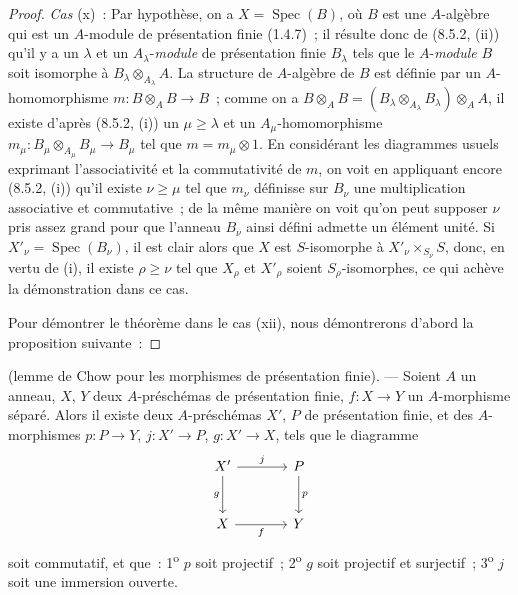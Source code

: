 \begin{proof}
\emph{Cas} (x)~: Par hypothèse, on a $X=\operatorname{Spec}(B)$, où $B$ est
une $A$-algèbre qui est un $A$-module de présentation finie (1.4.7)~; il
résulte donc de (8.5.2, (ii)) qu'il y a un $\lambda$ et un $A_\lambda$-\emph{module}
de présentation finie $B_\lambda$ tels que le $A$-\emph{module} $B$ soit isomorphe à
$B_\lambda\otimes_{A_\lambda}A$. La structure de $A$-algèbre de $B$ est
définie par un $A$-homomorphisme $m:B\otimes_AB\to B$~; comme on a
$B\otimes_AB=(B_\lambda\otimes_{A_\lambda}B_\lambda)\otimes_AA$, il existe
d'après (8.5.2, (i)) un $\mu\geq\lambda$ et un $A_\mu$-homomorphisme
$m_\mu:B_\mu\otimes_{A_\mu}B_\mu\to B_\mu$ tel que $m=m_\mu\otimes1$. En
considérant les diagrammes usuels exprimant l'associativité et la
commutativité de $m$, on voit en appliquant encore (8.5.2, (i)) qu'il existe
$\nu\geq\mu$ tel que $m_\nu$ définisse sur $B_\nu$ une multiplication
associative et commutative~; de la même manière on voit qu'on peut supposer
$\nu$ pris assez grand pour que l'anneau $B_\nu$ ainsi défini admette un
élément unité. Si $X'_\nu=\operatorname{Spec}(B_\nu)$, il est clair alors que
$X$ est $S$-isomorphe à $X'_\nu\times_{S_\nu}S$, donc, en vertu de (i), il
existe $\rho\geq\nu$ tel que $X_\rho$ et $X'_\rho$ soient
$S_\rho$-isomorphes, ce qui achève la démonstration dans ce cas.

Pour démontrer le théorème dans le cas (xii), nous démontrerons d'abord la
proposition suivante~:
\end{proof}

\begin{proposition}[8.10.5.1]
\label{IV.8.10.5.1-fr}
(lemme de Chow pour les morphismes de présentation finie). --- Soient $A$ un
anneau, $X$, $Y$ deux $A$-préschémas de présentation finie,
$f:X\to Y$
un $A$-morphisme séparé. Alors il existe deux $A$-préschémas $X'$, $P$ de
présentation finie, et des $A$-morphismes $p:P\to Y$, $j:X'\to P$,
$g:X'\to X$, tels que le diagramme
\[
\begin{tikzcd}[column sep=large,row sep=large]
X' \arrow[r,"j"] \arrow[d,"g"'] & P \arrow[d,"p"] \\
X \arrow[r,"f"'] & Y
\end{tikzcd}
\]
soit commutatif, et que~: \textup{1\textsuperscript{o}} $p$ soit projectif~;
\textup{2\textsuperscript{o}} $g$ soit projectif et surjectif~;
\textup{3\textsuperscript{o}} $j$ soit une immersion ouverte.
\end{proposition}


